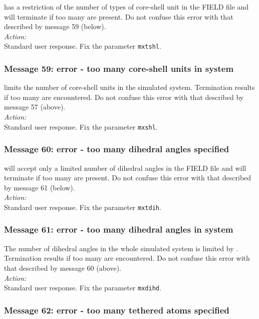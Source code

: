 \D{} has a restriction of the number of types of core-shell
unit in the FIELD file and will terminate if too many are present.  Do
not confuse this error with that described by message 59 (below).
\\

\noindent
{\em Action:} \\ 
Standard user response. Fix the parameter {\tt mxtshl}.

\subsubsection*{Message 59: error - too many core-shell units in system}

\D{} limits the number of core-shell units in the simulated system.
Termination results if too many are encountered.  Do not confuse this
error with that described by message 57 (above). \\
 
\noindent
{\em Action:} \\ 
Standard user response. Fix the parameter {\tt mxshl}.

\subsubsection*{Message 60: error - too many dihedral angles specified}

\D{} will accept only a limited number of dihedral
angles  in the FIELD file and will terminate
if too many are present.  Do not confuse this error with that
described by message 61 (below). \\


\noindent
{\em Action:} \\ 
Standard user response. Fix the parameter {\tt mxtdih}.

\subsubsection*{Message 61: error - too many dihedral angles in system}

The number of dihedral angles  in the whole
simulated system is limited by \D{}. Termination results if too many are
encountered.  Do not confuse this error with that described by message
60 (above). \\
 

\noindent
{\em Action:} \\ 
Standard user response. Fix the parameter {\tt mxdihd}.

\subsubsection*{Message 62: error - too many tethered atoms specified}


